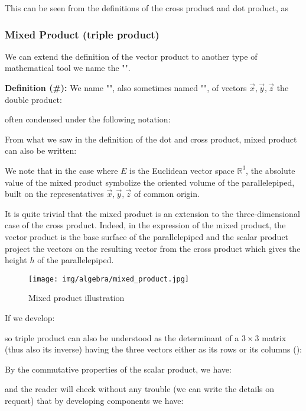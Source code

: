	This can be seen from the definitions of the cross product and dot product, as
	
	
	\pagebreak
	\subsubsection{Mixed Product (triple product)}
	We can extend the definition of the vector product to another type of mathematical tool we name the "".
	
	\textbf{Definition (\#\mydef):} We name "\label{mixed product}", also sometimes named  "", of vectors $\vec{x},\vec{y},\vec{z}$ the double product:
	 
	 often condensed under the following notation:
	  
	 From what we saw in the definition of the dot and cross product, mixed product can also be written:
	 
	 We note that in the case where $E$ is the Euclidean vector space $\mathbb{R}^3$, the absolute value of the mixed product symbolize the oriented volume of the parallelepiped, built on the representatives $\vec{x},\vec{y},\vec{z}$ of common origin.
	 
	It is quite trivial that the mixed product is an extension to the three-dimensional case of the cross product. Indeed, in the expression of the mixed product, the vector product is the base surface of the parallelepiped and the scalar product project the vectors on the resulting vector from the cross product which gives the height $h$ of the parallelepiped.
	
	\begin{figure}[H]
		\centering
		\texttt{[image: img/algebra/mixed\_product.jpg]}
		\caption{Mixed product illustration}		
	\end{figure}
			
	If we develop:
	
	so triple product can also be understood as the determinant of a $3\times 3$ matrix (thus also its inverse) having the three vectors either as its rows or its columns ():
	
	 By the commutative properties of the scalar product, we have:
	 
	and the reader will check without any trouble (we can write the details on request) that by developing components we have:
	
